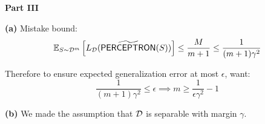 \documentclass[a4paper, 12pt]{article}
\begin{document}
\begin{problem} [Problem 2]
    \textbf{Part III}

    \textbf{(a)} Mistake bound:
    \begin{align*}
        \mathbb{E}_{S \sim \mathcal{D}^m} \left[L_{\mathcal{D}}(\widetilde{\textsf{PERCEPTRON}}(S))\right] \leq \frac{M}{m+1} \leq \frac{1}{(m+1)\gamma^2}
    \end{align*}

    Therefore to ensure expected generalization error at most $\epsilon$, want:
    \begin{equation*}
    \frac{1}{(m+1) \gamma^2} \leq \epsilon \implies m \geq \frac{1}{\epsilon \gamma^2} - 1
    \end{equation*}

    \textbf{(b)} We made the assumption that $\mathcal{D}$ is separable with margin $\gamma$.
\end{problem}
\end{document}
